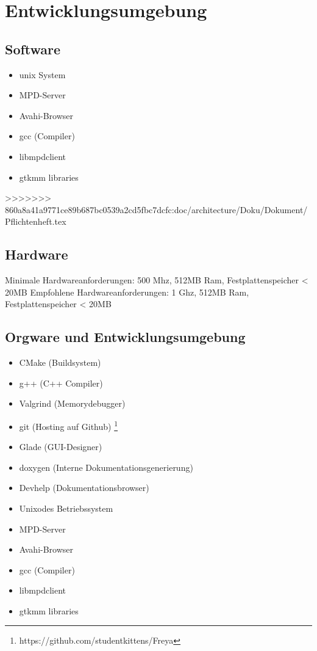 \section{Entwicklungsumgebung}
\subsection{Software}
\begin{itemize}
	\item unix System
	\item MPD-Server	
	\item Avahi-Browser
	\item gcc (Compiler)
	\item libmpdclient
	\item gtkmm libraries
\end{itemize}
>>>>>>> 860a8a41a9771ce89b687bc0539a2cd5fbc7dcfc:doc/architecture/Doku/Dokument/Pflichtenheft.tex
\subsection{Hardware}
Minimale Hardwareanforderungen: 500 Mhz, 512MB Ram, Festplattenspeicher < 20MB
Empfohlene Hardwareanforderungen: 1 Ghz, 512MB Ram, Festplattenspeicher < 20MB

\subsection{Orgware und Entwicklungsumgebung}
\begin{itemize}
	\item CMake (Buildsystem)
	\item g++ (C++ Compiler)
	\item Valgrind (Memorydebugger)
	\item git (Hosting auf Github) \footnote{https://github.com/studentkittens/Freya}
	\item Glade (GUI-Designer)
	\item doxygen  (Interne Dokumentationsgenerierung)
	\item Devhelp (Dokumentationsbrowser)
	\item Unixodes Betriebssystem
    	\item MPD-Server	
    	\item Avahi-Browser
    	\item gcc (Compiler)
    	\item libmpdclient
    	\item gtkmm libraries
\end{itemize}
